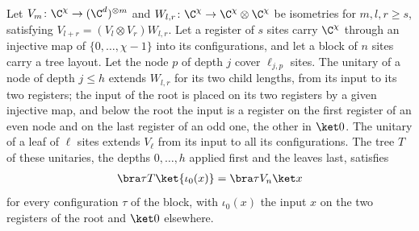 \begin{lemma}
    \label{thm:ldp_unequal_tree_isometry}
    \leanok
    Let $V_m\colon\C^\chi\to(\C^d)^{\otimes m}$ and
    $W_{l,r}\colon\C^\chi\to\C^\chi\otimes\C^\chi$ be isometries for
    $m,l,r\ge s$, satisfying $V_{l+r}=(V_l\otimes V_r)W_{l,r}$.
    Let a register of $s$ sites carry $\C^\chi$ through an injective map of
    $\{0,\dots,\chi-1\}$ into its configurations, and let a block of $n$ sites
    carry a tree layout. Let the node $p$ of depth $j$ cover $\ell_{j,p}$ sites.
    The unitary of a node of depth $j\le h$ extends $W_{l,r}$ for its
    two child lengths, from its input to
    its two registers; the input of the root is placed on its two registers by
    a given injective map, and below the root the input is a register on the
    first register of an even node and on the last register of an odd one, the
    other in $\ket0$. The unitary of a leaf of $\ell$ sites extends $V_\ell$ from
    its input to all its configurations. The tree $T$ of these unitaries, the
    depths $0,\dots,h$ applied first and the leaves last, satisfies
    \begin{align*}
        \bra\tau T\ket{\iota_0(x)}=\bra\tau V_n\ket x
    \end{align*}
    for every configuration $\tau$ of the block, with $\iota_0(x)$ the input
    $x$ on the two registers of the root and $\ket0$ elsewhere.
\end{lemma}
